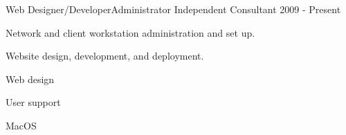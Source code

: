 \begin{cventries}
  \cventry
    {Web Designer/Developer{\enskip\cdotp\enskip}Administrator} %
    {Independent Consultant} %
    {} %
    {2009 - Present} %
    {
      \begin{cvitems} %
        \item {Network and client workstation administration and set up.}
        \item {Website design, development, and deployment.}
      \end{cvitems}
    }
    \begin{cventryskills}
      \item Web design
      \item User support
      \item MacOS
    \end{cventryskills}

\end{cventries}
